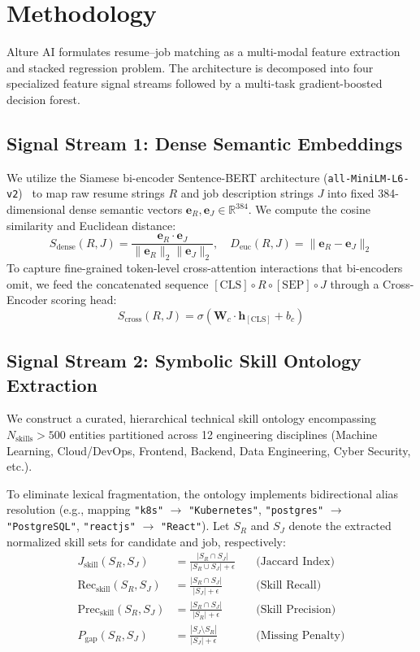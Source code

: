 \documentclass[conference]{IEEEtran}
\begin{document}
\section{Methodology}

Alture AI formulates resume--job matching as a multi-modal feature extraction and stacked regression problem. The architecture is decomposed into four specialized feature signal streams followed by a multi-task gradient-boosted decision forest.

\subsection{Signal Stream 1: Dense Semantic Embeddings}
We utilize the Siamese bi-encoder Sentence-BERT architecture (\texttt{all-MiniLM-L6-v2})~\cite{reimers2019} to map raw resume strings $R$ and job description strings $J$ into fixed 384-dimensional dense semantic vectors $\mathbf{e}_R, \mathbf{e}_J \in \mathbb{R}^{384}$. We compute the cosine similarity and Euclidean distance:
\begin{equation}
S_{\text{dense}}(R, J) = \frac{\mathbf{e}_R \cdot \mathbf{e}_J}{\|\mathbf{e}_R\|_2 \|\mathbf{e}_J\|_2}, \quad D_{\text{euc}}(R, J) = \|\mathbf{e}_R - \mathbf{e}_J\|_2
\end{equation}
To capture fine-grained token-level cross-attention interactions that bi-encoders omit, we feed the concatenated sequence $[\text{CLS}] \circ R \circ [\text{SEP}] \circ J$ through a Cross-Encoder scoring head:
\begin{equation}
S_{\text{cross}}(R, J) = \sigma\left(\mathbf{W}_c \cdot \mathbf{h}_{[\text{CLS}]} + b_c\right)
\end{equation}

\subsection{Signal Stream 2: Symbolic Skill Ontology Extraction}
We construct a curated, hierarchical technical skill ontology encompassing $N_{\text{skills}} > 500$ entities partitioned across 12 engineering disciplines (Machine Learning, Cloud/DevOps, Frontend, Backend, Data Engineering, Cyber Security, etc.). 

To eliminate lexical fragmentation, the ontology implements bidirectional alias resolution (e.g., mapping \texttt{"k8s"} $\rightarrow$ \texttt{"Kubernetes"}, \texttt{"postgres"} $\rightarrow$ \texttt{"PostgreSQL"}, \texttt{"reactjs"} $\rightarrow$ \texttt{"React"}). Let $S_R$ and $S_J$ denote the extracted normalized skill sets for candidate and job, respectively:
\begin{align}
J_{\text{skill}}(S_R, S_J) &= \frac{|S_R \cap S_J|}{|S_R \cup S_J| + \epsilon} \quad &\text{(Jaccard Index)} \\
\text{Rec}_{\text{skill}}(S_R, S_J) &= \frac{|S_R \cap S_J|}{|S_J| + \epsilon} \quad &\text{(Skill Recall)} \\
\text{Prec}_{\text{skill}}(S_R, S_J) &= \frac{|S_R \cap S_J|}{|S_R| + \epsilon} \quad &\text{(Skill Precision)} \\
P_{\text{gap}}(S_R, S_J) &= \frac{|S_J \setminus S_R|}{|S_J| + \epsilon} \quad &\text{(Missing Penalty)}
\end{align}
\end{document}
